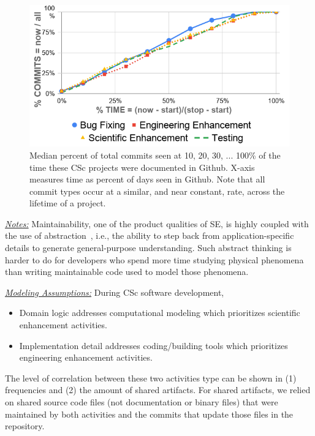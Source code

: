 \documentclass[conference,10pt]{IEEEtran}
\newcommand{\bi}{\begin{itemize}}
\newcommand{\ei}{\end{itemize}}
\begin{document}
\begin{figure}[!t]
\vspace{-20pt}
\begin{center}\includegraphics[width=\linewidth]{img/belief_chart.png}\end{center} 
\vspace{-15pt}
\caption{Median percent  of total commits seen
at 10, 20, 30, ... 100\% of 
the time these CSc projects were
documented in Github.
X-axis measures time as percent of days seen in Github.
Note
that all commit types occur
at a similar, and near constant,
 rate, across the lifetime of a project.}\label{fig:belief1} 
\vspace{-15pt} 
\end{figure} 



\noindent \textit{\underline{Notes:}} Maintainability, one of the product qualities of SE, is highly coupled with the
use of abstraction~\cite{huang_abstraction}, i.e., the ability to step back from application-specific
details to generate general-purpose understanding. Such abstract thinking is harder to do for developers who spend more time studying physical phenomena than writing maintainable code used to model those phenomena.


\noindent \textit{\underline{Modeling Assumptions:}} During CSc software development,
\bi
\item Domain logic addresses computational modeling which prioritizes scientific enhancement activities. 
\item Implementation detail addresses coding/building tools which prioritizes engineering enhancement activities. 
\ei

The level of correlation between these two activities type can be shown in (1) frequencies and (2) the amount of shared artifacts. For shared artifacts, we relied on shared source code files (not documentation or binary files) that were maintained by both activities and the commits that update those files in the repository. 
\end{document}
